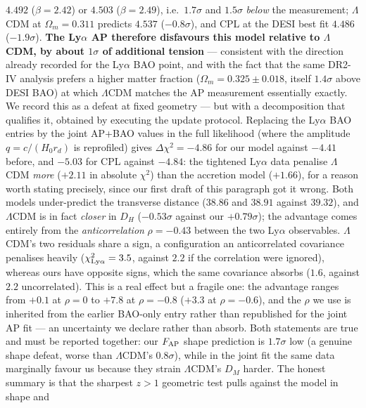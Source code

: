 \documentclass[11pt]{article}
\begin{document}
$4.492$ ($\beta = 2.42$) or $4.503$ ($\beta = 2.49$), i.e.\ $1.7\sigma$ and $1.5\sigma$ \emph{below} the measurement; $\Lambda$CDM at $\Omega_m = 0.311$ predicts $4.537$ ($-0.8\sigma$), and CPL at the DESI best fit $4.486$ ($-1.9\sigma$). \textbf{The Ly$\alpha$ AP therefore disfavours this model relative to $\Lambda$CDM, by about $1\sigma$ of additional tension} --- consistent with the direction already recorded for the Ly$\alpha$ BAO point, and with the fact that the same DR2-IV analysis prefers a higher matter fraction ($\Omega_m = 0.325 \pm 0.018$, itself $1.4\sigma$ above DESI BAO) at which $\Lambda$CDM matches the AP measurement essentially exactly. We record this as a defeat at fixed geometry --- but with a decomposition that
qualifies it, obtained by executing the update protocol. Replacing the Ly$\alpha$ BAO entries by the
joint AP+BAO values in the full likelihood (where the amplitude $q = c/(H_0 r_d)$ is reprofiled)
gives $\Delta\chi^2 = -4.86$ for our model against $-4.41$ before, and $-5.03$ for CPL against
$-4.84$: the tightened Ly$\alpha$ data penalise $\Lambda$CDM \emph{more} ($+2.11$ in absolute
$\chi^2$) than the accretion model ($+1.66$), for a reason worth stating precisely, since our first
draft of this paragraph got it wrong. Both models under-predict the transverse distance
($38.86$ and $38.91$ against $39.32$), and $\Lambda$CDM is in fact \emph{closer} in $D_H$
($-0.53\sigma$ against our $+0.79\sigma$); the advantage comes entirely from the
\emph{anticorrelation} $\rho = -0.43$ between the two Ly$\alpha$ observables. $\Lambda$CDM's two
residuals share a sign, a configuration an anticorrelated covariance penalises heavily
($\chi^2_{\rm Ly\alpha} = 3.5$, against $2.2$ if the correlation were ignored), whereas ours have
opposite signs, which the same covariance absorbs ($1.6$, against $2.2$ uncorrelated). This is a
real effect but a fragile one: the advantage ranges from $+0.1$ at $\rho = 0$ to $+7.8$ at $\rho = -0.8$ ($+3.3$ at $\rho = -0.6$), and the $\rho$ we use is inherited from the earlier BAO-only entry rather than
republished for the joint AP fit --- an uncertainty we declare rather than absorb. Both statements are true and must be reported together: our $F_{\rm AP}$ shape
prediction is $1.7\sigma$ low (a genuine shape defeat, worse than $\Lambda$CDM's $0.8\sigma$), while
in the joint fit the same data marginally favour us because they strain $\Lambda$CDM's $D_M$ harder.
The honest summary is that the sharpest $z > 1$ geometric test pulls against the model in shape and
\end{document}
